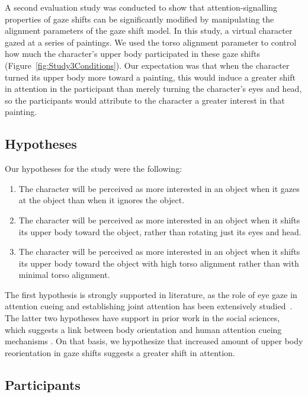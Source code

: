 A second evaluation study was conducted to show that attention-signalling properties of gaze shifts can be significantly modified by manipulating the alignment parameters of the gaze shift model. In this study, a virtual character gazed at a series of paintings. We used the torso alignment parameter to control how much the character's upper body participated in these gaze shifts (Figure~\ref{fig:Study3Conditions}). Our expectation was that when the character turned its upper body more toward a painting, this would induce a greater shift in attention in the participant than merely turning the character's eyes and head, so the participants would attribute to the character a greater interest in that painting.

\subsection{Hypotheses}

Our hypotheses for the study were the following:

\begin{enumerate}
\item The character will be perceived as more interested in an object when it gazes at the object than when it ignores the object.
\item The character will be perceived as more interested in an object when it shifts its upper body toward the object, rather than rotating just its eyes and head.
\item The character will be perceived as more interested in an object when it shifts its upper body toward the object with high torso alignment rather than with minimal torso alignment.
\end{enumerate}

The first hypothesis is strongly supported in literature, as the role of eye gaze in attention cueing and establishing joint attention has been extensively studied~\citep{frischen2007gaze}. The latter two hypotheses have support in prior work in the social sciences, which suggests a link between body orientation and human attention cueing mechanisms \citep{hietanen2002social,pomianowska2011socialcues,kendon1990conducting,schegloff1998bodytorque}. On that basis, we hypothesize that increased amount of upper body reorientation in gaze shifts suggests a greater shift in attention.

\subsection{Participants}

